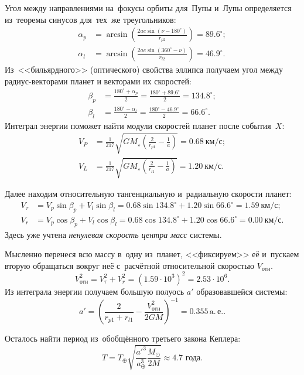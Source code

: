 \documentclass[12pt]{article}
\begin{document}
    Угол между направлениями на~фокусы орбиты
    для~Пупы и~Лупы определяется из~теоремы синусов для~тех~же треугольников:
    \begin{align}
        \alpha_p &= \arcsin\left(\frac{2 a e
            \sin \left( \nu - 180^\circ \right)}
            {r_{p2}}\right) = 89.6^\circ; \\
        \alpha_l &= \arcsin\left(\frac{2 a e
            \sin \left( 360^\circ - \nu \right)}{r_{l2}}\right) = 46.9^\circ.
    \end{align}
    Из~<<бильярдного>> (оптического) свойства эллипса получаем угол 
    между радиус-векторами планет и векторами их скоростей:
    \begin{align}
    	\beta_p &= \frac{180^\circ+ \alpha_p}{2} = \frac{180^\circ + 89.6^\circ}{2} = 134.8^\circ; \\
    	\beta_l &= \frac{180^\circ- \alpha_l}{2} = \frac{180^\circ - 46.9^\circ}{2} = 66.6^\circ. 
    \end{align} 
    Интеграл энергии поможет найти модули скоростей планет
    после события~$X$: 
    \begin{align}
    	V_P &= \frac{1}{217} \sqrt{GM_\star
            \left( \frac{2}{r_{p1}} - \frac{1}{a}\right)} = 0.68~км/с;
    \\
        V_L &= \frac{1}{217} \sqrt{GM_\star
            \left( \frac{2}{r_{l1}} - \frac{1}{a}\right)} = 1.20~км/с.
    \end{align}

    Далее находим относительную тангенциальную и~радиальную скорости
    планет:
    \begin{align}
    	V_\tau &= V_p \sin \beta_p + V_l \sin \beta_l = 0.68 \sin 134.8^\circ + 1.20 \sin 66.6^\circ = 1.59~км/с; \\
    	V_r &= V_p \cos \beta_p + V_l \cos \beta_l = 0.68 \cos 134.8^\circ + 1.20 \cos 66.6^\circ = 0.00~км/с.
    \end{align}
    Здесь уже учтена \emph{ненулевая скорость центра масс} системы.

    Мысленно перенеся всю массу в~одну из~планет, <<фиксируем>> её
    и~пускаем вторую обращаться вокруг неё
    с~расчётной относительной скоростью $V_\text{отн}$.
    \[
        V_\text{отн}^2 = V_\tau^2 + V_r^2 = (1.59\cdot 10^3)^2 = 2.53 \cdot 10^6.
    \]
    Из интеграла энергии получаем большую полуось $a'$ образовавшейся системы:
    \[
    	a' = \left( \frac{2}{r_{p1} + r_{l1}} -
            \frac{V_\text{отн}^2}{2GM} \right)^{-1}
             = 0.355 \, \text{a.}\,\text{е.}.
    \]
     
    Осталось найти период из~обобщённого третьего закона Кеплера: 
    \[
        T = T_\oplus \sqrt{\frac{a'^3}{a_\oplus^3} 
            \frac{M_\odot}{2M}} \approx 4.7 \text{ года}.
    \]
	
\end{document}

